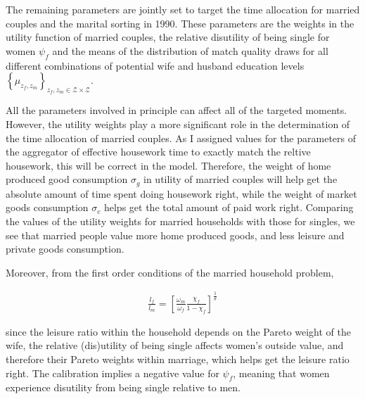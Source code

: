 \documentclass[12pt]{article}
\begin{document}
The remaining parameters are jointly set to target the time allocation for married couples and the marital sorting in 1990. These parameters are the weights in the utility function of married couples, the relative disutility of being single for women $\psi_f$ and the means of the distribution of match quality draws for all different combinations of potential wife and husband education levels $\left\lbrace \mu_{z_f,z_m}\right\rbrace_{z_f,z_m\in \mathcal{Z}\times\mathcal{Z}}$. 

All the parameters involved in principle can affect all of the targeted moments. However, the utility weights play a more significant role in the determination of the time allocation of married couples. As I assigned values for the parameters of the aggregator of effective housework time to exactly match the reltive housework, this will be correct in the model. Therefore, the weight of home produced good consumption $\sigma_g$ in utility of married couples will help get the absolute amount of time spent doing housework right, while the weight of market goods consumption $\sigma_c$ helps get the total amount of paid work right. Comparing the values of the utility weights for married households with those for singles, we see that married people value more home produced goods, and less leisure and private goods consumption. 

Moreover, from the first order conditions of the married household problem,

\begin{align*}
\frac{l_f}{l_m} = \left[\frac{\omega_m}{\omega_f}\frac{\chi_f}{1-\chi_f}\right]^\frac{1}{\sigma}
\end{align*}     

since the leisure ratio within the household depends on the Pareto weight of the wife, the relative (dis)utility of being single affects women's outside value, and therefore their Pareto weights within marriage, which helps get the leisure ratio right. The calibration implies a negative value for $\psi_f$, meaning that women experience disutility from being single relative to men.

\end{document}
